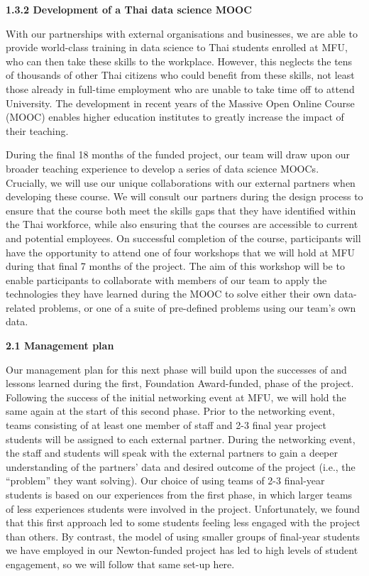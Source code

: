 \documentclass[11pt]{article}
\begin{document}
  \vspace{2mm}
  \noindent
  {\bf 1.3.2 Development of a Thai data science MOOC}
  
  \noindent
  With our partnerships with external organisations and businesses, we are able to provide world-class training in data science to Thai students enrolled at MFU, who can then take these skills to the workplace. However, this neglects the tens of thousands of other Thai citizens who could benefit from these skills, not least those already in full-time employment who are unable to take time off to attend University. The development in recent years of the Massive Open Online Course (MOOC) enables higher education institutes to greatly increase the impact of their teaching.
   
  \vspace{2mm}
  \noindent
  During the final 18 months of the funded project, our team will draw upon our broader teaching experience to develop a series of data science MOOCs. Crucially, we will use our unique collaborations with our external partners when developing these course. We will consult our partners during the design process to ensure that the course both meet the skills gaps that they have identified within the Thai workforce, while also ensuring that the courses are accessible to current and potential employees. On successful completion of the course, participants will have the opportunity to attend one of four workshops that we will hold at MFU during that final 7 months of the project. The aim of this workshop will be to enable participants to collaborate with members of our team to apply the technologies they have learned during the MOOC to solve either their own data-related problems, or one of a suite of pre-defined problems using our team's own data.
  
  \pagebreak

  \vspace{3mm}
  \noindent
  {\large \bf 2.1 Management plan}
    
  \noindent
  Our management plan for this next phase will build upon the successes of and lessons learned during the first, Foundation Award-funded, phase of the project. Following the success of the initial networking event at MFU, we will hold the same again at the start of this second phase. Prior to the networking event, teams consisting of at least one member of staff and 2-3 final year project students will be assigned to each external partner. During the networking event, the staff and students will speak with the external partners to gain a deeper understanding of the partners' data and desired outcome of the project (i.e., the ``problem'' they want solving). Our choice of using teams of 2-3 final-year students is based on our experiences from the first phase, in which larger teams of less experiences students were involved in the project. Unfortunately, we found that this first approach led to some students feeling less engaged with the project than others. By contrast, the model of using smaller groups of final-year students we have employed in our Newton-funded project has led to high levels of student engagement, so we will follow that same set-up here.
  
\end{document}
